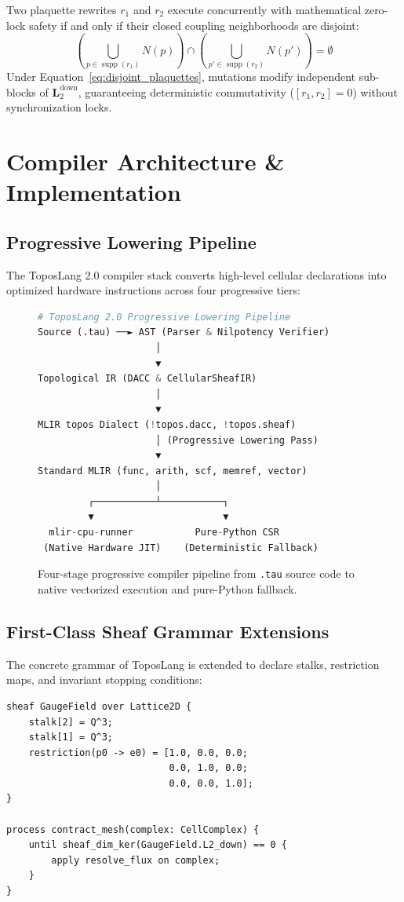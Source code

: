 \documentclass[conference]{IEEEtran}
\begin{document}
Two plaquette rewrites $r_1$ and $r_2$ execute concurrently with mathematical zero-lock safety if and only if their closed coupling neighborhoods are disjoint:
\begin{equation}
\left( \bigcup_{p \in \operatorname{supp}(r_1)} N(p) \right) \cap \left( \bigcup_{p' \in \operatorname{supp}(r_2)} N(p') \right) = \emptyset
\label{eq:disjoint_plaquettes}
\end{equation}
Under Equation~\eqref{eq:disjoint_plaquettes}, mutations modify independent sub-blocks of $\mathbf{L}_2^{\text{down}}$, guaranteeing deterministic commutativity ($[r_1, r_2] = 0$) without synchronization locks.

\section{Compiler Architecture \& Implementation}

\subsection{Progressive Lowering Pipeline}
The ToposLang 2.0 compiler stack converts high-level cellular declarations into optimized hardware instructions across four progressive tiers:

\begin{figure}[htbp]
\centering
\begin{lstlisting}[language=Python]
# ToposLang 2.0 Progressive Lowering Pipeline
Source (.tau) ──► AST (Parser & Nilpotency Verifier)
                     │
                     ▼
Topological IR (DACC & CellularSheafIR)
                     │
                     ▼
MLIR topos Dialect (!topos.dacc, !topos.sheaf)
                     │ (Progressive Lowering Pass)
                     ▼
Standard MLIR (func, arith, scf, memref, vector)
                     │
         ┌───────────┴───────────┐
         ▼                       ▼
  mlir-cpu-runner           Pure-Python CSR
 (Native Hardware JIT)    (Deterministic Fallback)
\end{lstlisting}
\caption{Four-stage progressive compiler pipeline from \texttt{.tau} source code to native vectorized execution and pure-Python fallback.}
\label{fig:pipeline}
\end{figure}

\subsection{First-Class Sheaf Grammar Extensions}
The concrete grammar of ToposLang is extended to declare stalks, restriction maps, and invariant stopping conditions:
\begin{lstlisting}
sheaf GaugeField over Lattice2D {
    stalk[2] = Q^3;
    stalk[1] = Q^3;
    restriction(p0 -> e0) = [1.0, 0.0, 0.0; 
                             0.0, 1.0, 0.0; 
                             0.0, 0.0, 1.0];
}

process contract_mesh(complex: CellComplex) {
    until sheaf_dim_ker(GaugeField.L2_down) == 0 {
        apply resolve_flux on complex;
    }
}
\end{lstlisting}
\end{document}
